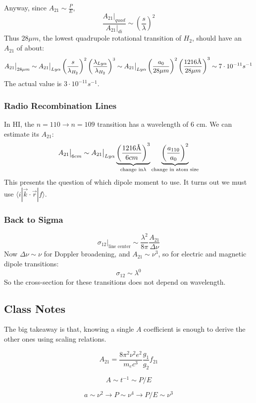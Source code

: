 \documentclass{article}
\newcommand{\be}{\begin{equation}}
\newcommand{\ee}{\end{equation}}
\def\lya{{Ly\alpha}}
\newcommand{\angstrom}{\mbox{\normalfont\AA}}
\def\sigot{\sigma_{12}}
\def\ato{{A_{21}}}
\def\eval#1{\big|_{#1}}
\def\sigot{\sigma_{12}}
\def\eval#1{\big|_{#1}}
\def\ato{{A_{21}}}
\def\e#1{\cdot10^{#1}}
\def\ato{{A_{21}}}
\begin{document}
Anyway, since $\ato\sim\frac{P}{E}$,
$$\boxed{\frac{\ato\eval{quad}}{\ato\eval{di}}
\sim\left(\frac{s}{\lambda}\right)^2}$$
Thus $28\mu m$, the lowest quadrupole rotational transition of
$H_2$, should have an $\ato$ of about:
$$\ato\eval{28\mu m}\sim\ato\eval\lya\left(\frac{s}{\lambda_{H_2}}\right)^2
\left(\frac{\lambda_\lya}{ \lambda_{H_2}}\right)^3
\sim\ato\eval\lya\left(\frac{a_0}{ 28\mu m}\right)^2
\left(\frac{1216\angstrom}{ 28\mu m}\right)^3
\sim7\e{-11}s^{-1}$$
The actual value is $3\e{-11}s^{-1}$.

\subsubsection{ Radio Recombination Lines}

In HI, the $n=110\to n=109$ transition has a wavelength of 6 cm.  We can
estimate its $\ato$:
$$\ato\eval{6cm}\sim\ato\eval{Ly\alpha}
\underbrace{\left(\frac{1216\angstrom}{6cm}\right)^3}_{\text{change in} \lambda}
\underbrace{\left(\frac{a_{110}}{ a_0}\right)^2}_{\text{change in atom size}}$$
\def\bra#1{\langle #1|}
\def\ket#1{|#1\rangle}
This presents the question of which dipole moment to use.  It turns out
we must use $\bra{i}\vec k\cdot\vec r\ket{f}$.

\subsubsection{ Back to Sigma}

$$\sigot\eval{\text{line center}}\sim\frac{\lambda^2}{8\pi}\frac{\ato}{\Delta\nu}$$
Now $\Delta\nu\sim\nu$ for Doppler broadening, and $\ato\sim\nu^3$, so for
electric and magnetic dipole transitions:
$$\sigot\sim\lambda^0$$
So the cross-section for these transitions does not depend on wavelength.

\subsection{Class Notes}

The big takeaway is that, knowing a single $A$ coefficient is enough to derive the other ones using scaling relations.

\begin{equation}
    A_{21}=\frac{8 \pi^{2} \nu^{2} e^{2}}{m_{e} c^{3}} \frac{g_{1}}{g_{2}} f_{21}
\end{equation}

\be
A \sim t^{-1} \sim P/E
\ee

\be
a \sim \nu^2 \rightarrow P \sim \nu^4 \rightarrow P/E \sim \nu ^3
\ee
\end{document}
